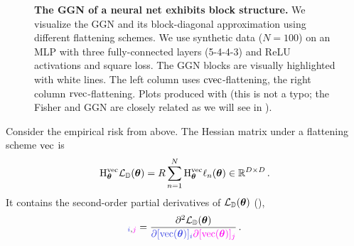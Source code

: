 \begin{figure}[!h]
\begin{minipage}[t]{0.495\linewidth}
  \end{minipage}
  \caption{\textbf{The GGN of a neural net exhibits block structure.}
    We visualize the GGN and its block-diagonal approximation using different flattening schemes.
    We use synthetic data ($N=100$) on an MLP with three fully-connected layers (5-4-4-3) and ReLU activations and square loss.
    The GGN blocks are visually highlighted with white lines.
    The left column uses $\cvec$-flattening, the right column $\rvec$-flattening.
    Plots produced with 
    (this is not a typo; the Fisher and GGN are closely related as we will see in ).
  }\label{fig:ggn-block-structure}
\end{figure}

\switchcolumn[0]
Consider the empirical risk from above.
The Hessian matrix under a flattening scheme $\vec$ is
\begin{align*}
  \hess_{\vtheta}^{\vec} \gL_{\sD}(\vtheta)
  =
  R
  \sum_{n=1}^N
  \hess_{\vtheta}^{\vec} \ell_n(\vtheta) \in \sR^{D \times D}\,.
\end{align*}
It contains the second-order partial derivatives of $\gL_{\sD}(\vtheta)$ (), \ie
\begin{align*}
  [\hess_{\vtheta}^{\vec} \gL_{\sD}(\vtheta)]_{\colored{i},\colored[VectorPink]{j}}
  =
  \frac{\partial^2 \gL_{\sD}(\vtheta)}{\colored{\partial [\vec(\vtheta)]_i} \colored[VectorPink]{\partial [\vec(\vtheta)]_j}}\,.
\end{align*}

